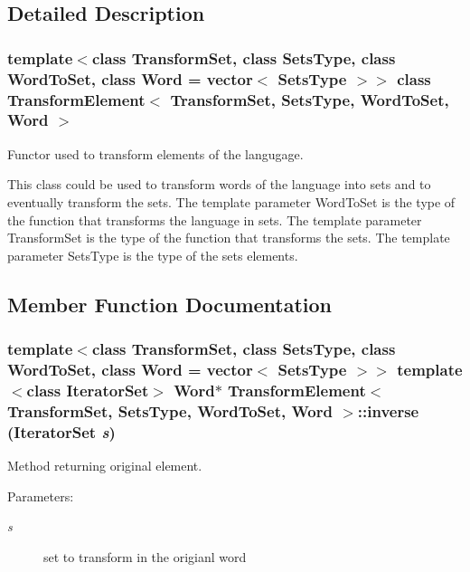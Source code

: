 \subsection{Detailed Description}
\subsubsection*{template$<$class Transform\-Set, class Sets\-Type, class Word\-To\-Set, class Word = vector$<$ Sets\-Type $>$$>$ class Transform\-Element$<$ Transform\-Set, Sets\-Type, Word\-To\-Set, Word $>$}

Functor used to transform elements of the langugage. 

This class could be used to transform words of the language into sets and to eventually transform the sets. The template parameter Word\-To\-Set is the type of the function that transforms the language in sets. The template parameter Transform\-Set is the type of the function that transforms the sets. The template parameter Sets\-Type is the type of the sets elements. 



\subsection{Member Function Documentation}
\subsubsection{\setlength{\rightskip}{0pt plus 5cm}template$<$class Transform\-Set, class Sets\-Type, class Word\-To\-Set, class Word = vector$<$ Sets\-Type $>$$>$ template$<$class Iterator\-Set$>$ Word$\ast$ {\bf Transform\-Element}$<$ Transform\-Set, Sets\-Type, Word\-To\-Set, Word $>$::inverse (Iterator\-Set {\em s})\hspace{0.3cm}{\tt  [inline]}}\label{class_transform_element_c7fc099ae3e5f139a9539e82788823f3}


Method returning original element. 

\begin{Desc}
\item[Parameters:]
\begin{description}
\item[{\em s}]set to transform in the origianl word \end{description}
\end{Desc}
